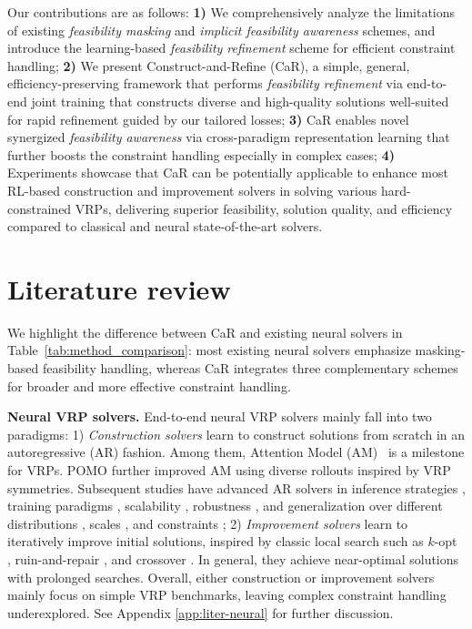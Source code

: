 \documentclass{article} %
\begin{document}
Our contributions are as follows:
\textbf{1)} We comprehensively analyze the limitations of existing \emph{feasibility masking} and \emph{implicit feasibility awareness} schemes, and introduce the learning-based \emph{feasibility refinement} scheme for efficient constraint handling; \textbf{2)} We present Construct-and-Refine (CaR), a simple, general, efficiency-preserving framework that performs  \textit{feasibility refinement} via end-to-end joint training that constructs diverse and high-quality solutions well-suited for rapid refinement guided by our tailored losses; \textbf{3)} CaR enables novel synergized \textit{feasibility awareness} via cross-paradigm representation learning that further boosts the constraint handling especially in complex cases; \textbf{4)} Experiments showcase that CaR can be potentially applicable to enhance most RL-based construction and improvement solvers in solving various hard-constrained VRPs, delivering superior feasibility, solution quality, and efficiency compared to classical and neural state-of-the-art solvers.

\section{Literature review}

We highlight the difference between CaR and existing neural solvers in Table~\ref{tab:method_comparison}: most existing neural solvers emphasize masking-based feasibility handling, whereas CaR integrates three complementary schemes for broader and more effective constraint handling.



\textbf{Neural VRP solvers.}
End-to-end neural VRP solvers mainly fall into two paradigms:
1) \emph{Construction solvers} learn to construct solutions from scratch in an autoregressive (AR) fashion.
Among them, {Attention Model (AM)~\citep{kool2018attention}} is a milestone for VRPs.
POMO \citep{kwon2020pomo} further improved AM using diverse rollouts inspired by VRP symmetries. Subsequent studies have advanced AR solvers in inference strategies \citep{ choo2022simulation}, training paradigms \citep{drakulic2023bq, hottung2025polynet}, 
 scalability \citep{jin2023pointerformer, hou2023generalize}, robustness \citep{geisler2022generalization}, and generalization over different distributions \citep{bi2022learning}, scales \citep{zhou2023towards, gao2023towards}, and constraints \citep{ zhou2024mvmoe,berto2024routefinder}; 
2) \emph{Improvement solvers} learn to iteratively improve initial solutions, inspired by classic local search such as $k$-opt~\citep{d2020learning,ma2023learning}
, ruin-and-repair \citep{hottung2022neural, ma2022efficient}, and crossover \citep{kim2023learning}. 
In general, they achieve near-optimal solutions with prolonged searches. Overall, either construction or improvement solvers mainly focus on simple VRP benchmarks, leaving complex constraint handling underexplored. 
See Appendix \ref{app:liter-neural} for further discussion. 
\end{document}
